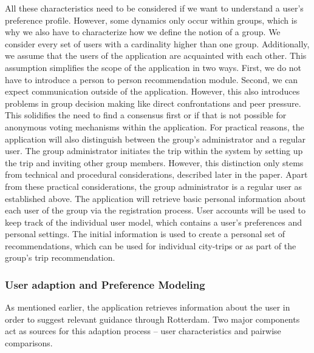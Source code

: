 \documentclass[11pt,a4paper,oneside]{article}
\begin{document}
All these characteristics need to be considered if we want to understand a user's preference profile. However, some dynamics only occur within groups, which is why we also have to characterize how we define the notion of a group. We consider every set of users with a cardinality higher than one group. Additionally, we assume that the users of the application are acquainted with each other. This assumption simplifies the scope of the application in two ways. First, we do not have to introduce a person to person recommendation module. Second, we can expect communication outside of the application. However, this also introduces problems in group decision making like direct confrontations and peer pressure.\cite{asch_OpinionsSocialPressure_1955}\cite{gitelson_InfluenceFriendsRelatives_1995} This solidifies the need to find a consensus first or if that is not possible for anonymous voting mechanisms within the application.
For practical reasons, the application will also distinguish between the group's administrator and a regular user. The group administrator initiates the trip within the system by setting up the trip and inviting other group members. However, this distinction only stems from technical and procedural considerations, described later in the paper. Apart from these practical considerations, the group administrator is a regular user as established above. 
The application will retrieve basic personal information about each user of the group via the registration process. User accounts will be used to keep track of the individual user model, which contains a user's preferences and personal settings. The initial information is used to create a personal set of recommendations, which can be used for individual city-trips or as part of the group's trip recommendation.
  	
\subsubsection{User adaption and Preference Modeling}
As mentioned earlier, the application retrieves information about the user in order to suggest relevant guidance through Rotterdam. Two major components act as sources for this adaption process -- user characteristics and pairwise comparisons. 
\end{document}
